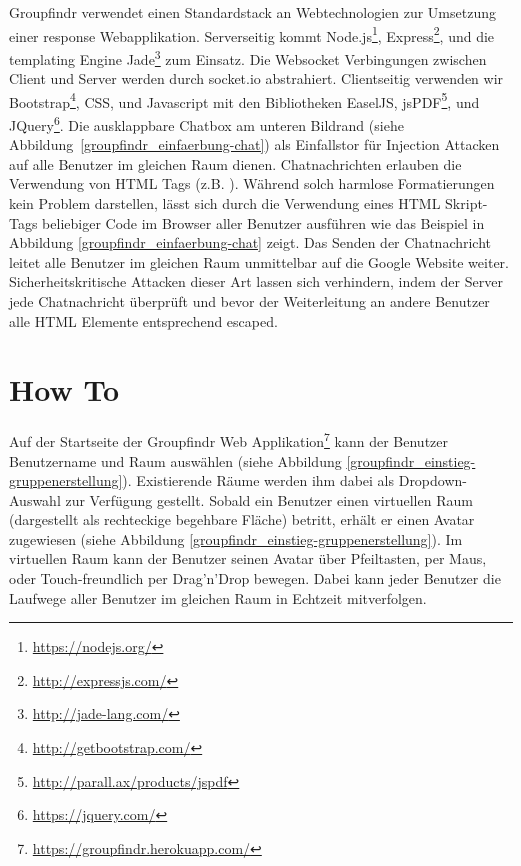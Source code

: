 Groupfindr verwendet einen Standardstack an Webtechnologien zur Umsetzung einer response Webapplikation. Serverseitig kommt Node.js\footnote{\url{https://nodejs.org/}}, Express\footnote{\url{http://expressjs.com/}}, und die templating Engine Jade\footnote{\url{http://jade-lang.com/}} zum Einsatz. Die Websocket Verbingungen zwischen Client und Server werden durch socket.io abstrahiert. Clientseitig verwenden wir Bootstrap\footnote{\url{http://getbootstrap.com/}}, CSS, und Javascript mit den Bibliotheken EaselJS, jsPDF\footnote{\url{http://parall.ax/products/jspdf}}, und JQuery\footnote{\url{https://jquery.com/}}.
\newline\newline
Die ausklappbare Chatbox am unteren Bildrand (siehe Abbildung~\ref{groupfindr_einfaerbung-chat}) als Einfallstor für Injection Attacken auf alle Benutzer im gleichen Raum dienen. Chatnachrichten erlauben die Verwendung von HTML Tags (z.B. ). Während solch harmlose Formatierungen kein Problem darstellen, lässt sich durch die Verwendung eines HTML Skript-Tags beliebiger Code im Browser aller Benutzer ausführen wie das Beispiel in Abbildung \ref{groupfindr_einfaerbung-chat} zeigt. 
\newline
Das Senden der Chatnachricht  leitet alle Benutzer im gleichen Raum unmittelbar auf die Google Website weiter. Sicherheitskritische Attacken dieser Art lassen sich verhindern, indem der Server jede Chatnachricht überprüft und bevor der Weiterleitung an andere Benutzer alle HTML Elemente entsprechend escaped.

\section{How To}
\label{how_to}

Auf der Startseite der Groupfindr Web Applikation\footnote{\url{https://groupfindr.herokuapp.com/}} kann der Benutzer Benutzername und Raum auswählen (siehe Abbildung \ref{groupfindr_einstieg-gruppenerstellung}). Existierende Räume werden ihm dabei als Dropdown-Auswahl zur Verfügung gestellt. Sobald ein Benutzer einen virtuellen Raum (dargestellt als rechteckige begehbare Fläche) betritt, erhält er einen Avatar zugewiesen (siehe Abbildung \ref{groupfindr_einstieg-gruppenerstellung}). Im virtuellen Raum kann der Benutzer seinen Avatar über Pfeiltasten, per Maus, oder Touch-freundlich per Drag’n’Drop bewegen. Dabei kann jeder Benutzer die Laufwege aller Benutzer im gleichen Raum in Echtzeit mitverfolgen.

